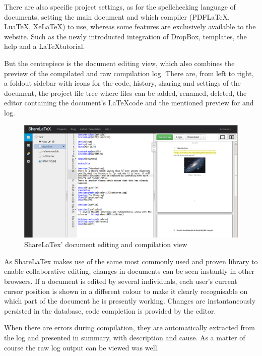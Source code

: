 There are also specific project settings, as for the spellchecking language of documents, setting the main document and which compiler (PDFLaTeX, LuaTeX, XeLaTeX) to use, whereas some features are exclusively available to the website. Such as the newly introducted integration of DropBox, templates, the help and a \LaTeX tutorial.

\pagebreak

But the centrepiece is the document editing view, which also combines the preview of the compilated  and raw compilation log. There are, from left to right, a foldout sidebar with icons for the code, history, sharing and settings of the document, the project file tree where files can be added, renamed, deleted, the editor containing the document's \LaTeX code and the mentioned preview for  and log.

\begin{figure}[h!]
	\centering
		\includegraphics[width=\textwidth]{images/sharelatex-editing.png}
	\caption{ShareLaTex' document editing and compilation view}
	\label{sharelatex-editing-view}
\end{figure}

As ShareLaTex makes use of the same most commonly used and proven library  to enable collaborative editing, changes in documents can be seen instantly in other browsers. If a document is edited by several individuals, each user's current cursor position is shown in a different colour to make it clearly recognisable on which part of the document he is presently working. Changes are instantaneously persisted in the database, code completion is provided by the editor.

When there are errors during compilation, they are automatically extracted from the log and presented in summary, with description and cause. As a matter of course the raw log output can be viewed was well.

